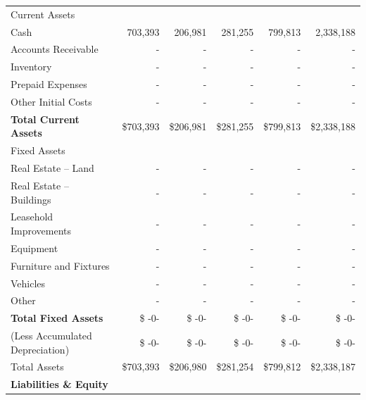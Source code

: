 \documentclass[11pt,openany]{book}
\begin{document}
\begin{landscape}
\begin{center}
\begin{longtable}[]{@{}lrrrrr@{}}
      \midrule
      \hspace{0mm} Current Assets & & & & & \\
      \hspace{3mm} Cash & 703,393 & 206,981 & 281,255 & 799,813 & 2,338,188 \\
      \hspace{3mm} Accounts Receivable & - & - & - & - & - \\
      \hspace{3mm} Inventory & - & - & - & - & - \\
      \hspace{3mm} Prepaid Expenses & - & - & - & - & - \\
      \hspace{3mm} Other Initial Costs & - & - & - & - & - \\
      \hfill \textbf{Total Current Assets} & \$703,393 & \$206,981 & \$281,255 & \$799,813 & \$2,338,188 \\
      \hspace{0mm} Fixed Assets & & & & & \\
      \hspace{3mm} Real Estate -- Land & - & - & - & - & - \\
      \hspace{3mm} Real Estate -- Buildings & - & - & - & - & - \\
      \hspace{3mm} Leasehold Improvements & - & - & - & - & - \\
      \hspace{3mm} Equipment & - & - & - & - & - \\
      \hspace{3mm} Furniture and Fixtures & - & - & - & - & - \\
      \hspace{3mm} Vehicles & - & - & - & - & - \\
      \hspace{3mm} Other & - & - & - & - & - \\
      \hfill \textbf{Total Fixed Assets} & \$ -0- & \$ -0- & \$ -0- & \$ -0- & \$ -0- \\
      \hspace{3mm} (Less Accumulated Depreciation) & \$ -0- & \$ -0- & \$ -0- & \$ -0- & \$ -0- \\
      \hspace{0mm} Total Assets & \$703,393 & \$206,980 & \$281,254 & \$799,812 & \$2,338,187 \\
      \textbf{Liabilities \& Equity} & & & & & \\

\end{longtable}
\end{center}
\end{landscape}
\end{document}
